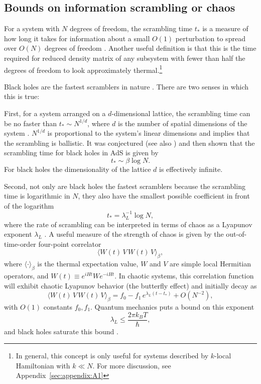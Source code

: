 \documentclass[12pt]{article}
\numberwithin{equation}{section}
\newcommand{\be}{\begin{equation}}
\newcommand{\ee}{\end{equation}}
\begin{document}
\subsection{Bounds on information scrambling or chaos}
 For a system with $N$ degrees of freedom, the scrambling time $t_*$ is a measure of how long it takes for information about a small $O(1)$ perturbation to spread over $O(N)$ degrees of freedom \cite{fastscramble}. Another useful definition \cite{Page:1993df} is that this is the time required for reduced density matrix of any subsystem with fewer than half the degrees of freedom  to look approximately thermal.\footnote{In general, this concept is only useful for systems described by  $k$-local Hamiltonian with $k \ll N$. For more discussion, see Appendix~\ref{sec:appendix:A1}}

 Black holes are the fastest scramblers in nature \cite{bhmirror,fastscramble,Maldacena:2015waa}. There are two senses in which this is true:

 First, for a system arranged on a $d$-dimensional lattice, the scrambling time can be no faster than $t_* \sim N^{1/d}$, where $d$ is the number of spatial dimensions of the system \cite{fastscramble}. $N^{1/d}$ is proportional to the system's linear dimensions and implies that the  scrambling is ballistic. It was conjectured \cite{bhmirror,fastscramble} (see also \cite{Lashkari:2011yi}) and then shown \cite{shock} that the scrambling time for black holes in AdS is given by
 \be
t_* \sim \beta \log N.
 \ee
For black holes the dimensionality of the lattice $d$ is effectively infinite.

Second, not only are black holes the fastest scramblers because the scrambling time is logarithmic in $N$, they also have the smallest possible coefficient in front of the logarithm
 \be
t_* = \lambda_{L}^{-1} \log N,
 \ee
where the rate of scrambling can be interpreted in terms of chaos as a Lyapunov exponent $\lambda_L$ \cite{kitaev,Maldacena:2015waa}. A useful measure of the strength of chaos is given by the out-of-time-order four-point correlator \cite{LarkinOvchinnikov}
\be
\langle W(t)\, V \,W(t)\, V\rangle_\beta,
\ee
where $\langle \cdot \rangle_\beta$ is the thermal expectation value, $W$ and $V$ are simple local Hermitian operators, and $W(t) \equiv e^{iHt} W e^{-iHt}$. In chaotic systems, this correlation function will exhibit chaotic Lyapunov behavior (the butterfly effect) and initially decay as \cite{LarkinOvchinnikov, kitaev, Maldacena:2015waa}
\be
\langle W(t)\, V \,W(t)\, V\rangle_\beta = f_0 - f_1\, e^{\lambda_L (t - t_*)} + O(N^{-2}),
\ee
with $O(1)$ constants $f_0, f_1$.
Quantum mechanics puts a bound on this exponent \cite{Maldacena:2015waa}
\be
\lambda_L \le \frac{2\pi k_B T}{\hbar},
\ee
and black holes saturate this bound \cite{shock,Shenker:2013yza,localshocks,kitaev,Shenker:2014cwa}.
\end{document}

